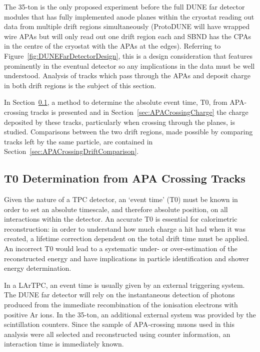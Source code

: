 The 35-ton is the only proposed experiment before the full DUNE far detector modules that has fully implemented anode planes within the cryostat reading out data from multiple drift regions simultaneously (ProtoDUNE will have wrapped wire APAs but will only read out one drift region each and SBND has the CPAs in the centre of the cryostat with the APAs at the edges).  Referring to Figure~\ref{fig:DUNEFarDetectorDesign}, this is a design consideration that features prominently in the eventual detector so any implications in the data must be well understood.  Analysis of tracks which pass through the APAs and deposit charge in both drift regions is the subject of this section.

In Section~\ref{sec:APACrossingT0}, a method to determine the absolute event time, T0, from APA-crossing tracks is presented and in Section~\ref{sec:APACrossingCharge} the charge deposited by these tracks, particularly when crossing through the planes, is studied.  Comparisons between the two drift regions, made possible by comparing tracks left by the same particle, are contained in Section~\ref{sec:APACrossingDriftComparison}.

\subsection{T0 Determination from APA Crossing Tracks}\label{sec:APACrossingT0}

Given the nature of a TPC detector, an `event time' (T0) must be known in order to set an absolute timescale, and therefore absolute position, on all interactions within the detector.  An accurate T0 is essential for calorimetric reconstruction: in order to understand how much charge a hit had when it was created, a lifetime correction dependent on the total drift time must be applied.  An incorrect T0 would lead to a systematic under- or over-estimation of the reconstructed energy and have implications in particle identification and shower energy determination.

In a LArTPC, an event time is usually given by an external triggering system.  The DUNE far detector will rely on the instantaneous detection of photons produced from the immediate recombination of the ionisation electrons with positive Ar ions.  In the 35-ton, an additional external system was provided by the scintillation counters.  Since the sample of APA-crossing muons used in this analysis were all selected and reconstructed using counter information, an interaction time is immediately known.

